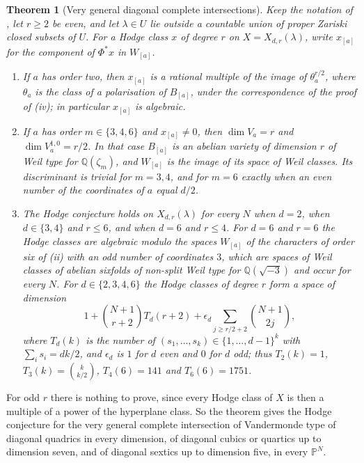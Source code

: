 \documentclass[11pt,reqno]{amsart}
\theoremstyle{plain}
\newtheorem{theorem}{Theorem}[section]
\theoremstyle{definition}
\theoremstyle{remark}
\newcommand{\QQ}{\mathbb{Q}}
\newcommand{\PP}{\mathbb{P}}
\begin{document}
\begin{theorem}[Very general diagonal complete
intersections]\label{thm:vgvandermonde}
Keep the notation of , let $r\ge2$ be even, and let
$\lambda\in U$ lie outside a countable union of proper Zariski closed
subsets of $U$. For a Hodge class $x$ of degree $r$ on $X=X_{d,r}(\lambda)$,
write $x_{[a]}$ for the component of $\Phi^{*}x$ in $W_{[a]}$.
\begin{enumerate}[label=\textup{(\roman*)},leftmargin=2.6em,itemsep=2pt]
\item If $a$ has order two, then $x_{[a]}$ is a rational multiple of the
  image of $\theta_{a}^{r/2}$, where $\theta_{a}$ is the class of a
  polarisation of $B_{[a]}$, under the correspondence of the proof of
  (iv); in particular $x_{[a]}$ is algebraic.
\item If $a$ has order $m\in\{3,4,6\}$ and $x_{[a]}\ne0$, then $\dim V_{a}=r$
  and $\dim V_{a}^{1,0}=r/2$. In that case $B_{[a]}$ is an abelian variety of
  dimension $r$ of Weil type for $\QQ(\zeta_{m})$, and $W_{[a]}$ is the image
  of its space of Weil classes. Its discriminant is trivial for $m=3,4$, and
  for $m=6$ exactly when an even number of the coordinates of $a$ equal
  $d/2$.
\item The Hodge conjecture holds on $X_{d,r}(\lambda)$ for every $N$ when
  $d=2$, when $d\in\{3,4\}$ and $r\le6$, and when $d=6$ and $r\le4$. For
  $d=6$ and $r=6$ the Hodge classes are algebraic modulo the spaces
  $W_{[a]}$ of the characters of order six of (ii) with an odd number of
  coordinates $3$, which are spaces of Weil classes of abelian sixfolds of
  non-split Weil type for $\QQ(\sqrt{-3})$ and occur for every $N$. For
  $d\in\{2,3,4,6\}$ the Hodge classes of degree $r$ form a space of dimension
  \[
    1+\binom{N+1}{r+2}T_{d}(r+2)+\epsilon_{d}\sum_{j\ge r/2+2}\binom{N+1}{2j},
  \]
  where $T_{d}(k)$ is the number of $(s_{1},\dots,s_{k})\in\{1,\dots,d-1\}^{k}$
  with $\sum_{i}s_{i}=dk/2$, and $\epsilon_{d}$ is $1$ for $d$ even and $0$ for
  $d$ odd; thus $T_{2}(k)=1$, $T_{3}(k)=\binom{k}{k/2}$, $T_{4}(6)=141$ and
  $T_{6}(6)=1751$.
\end{enumerate}
\end{theorem}

For odd $r$ there is nothing to prove, since every Hodge class of $X$ is
then a multiple of a power of the hyperplane class. So the theorem gives the
Hodge conjecture for the very general complete intersection of Vandermonde
type of diagonal quadrics in every dimension, of diagonal cubics or quartics
up to dimension seven, and of diagonal sextics up to dimension five, in
every $\PP^{N}$.
\end{document}
